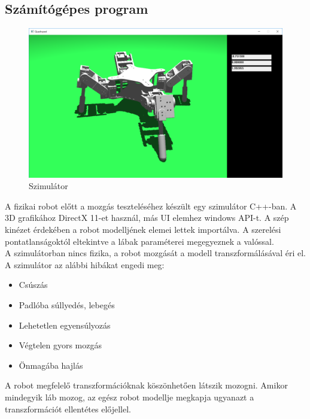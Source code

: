 \documentclass{article}
\begin{document}
\subsection{Számítógépes program}
\begin{figure}[h]
	\begin{minipage}{0.9\textwidth}
		\caption{Szimulátor}
		\includegraphics[width=\textwidth]{sim}
	\end{minipage}
\end{figure}
A fizikai robot előtt a mozgás teszteléséhez készült egy szimulátor C++-ban. A 3D grafikához DirectX 11-et használ, más UI elemhez windows API-t. A szép kinézet érdekében a robot modelljének elemei lettek importálva. A szerelési pontatlanságoktól eltekintve a lábak paraméterei megegyeznek a valóssal.\\
A szimulátorban nincs fizika, a robot mozgását a modell transzformálásával éri el. A szimulátor az alábbi hibákat engedi meg:
\begin{itemize}
	\item Csúszás
	\item Padlóba súllyedés, lebegés
	\item Lehetetlen egyensúlyozás
	\item Végtelen gyors mozgás
	\item Önmagába hajlás
\end{itemize}
A robot megfelelő transzformációknak köszönhetően látszik mozogni. Amikor mindegyik láb mozog, az egész robot modellje megkapja ugyanazt a transzformációt ellentétes előjellel.\\
\end{document}
